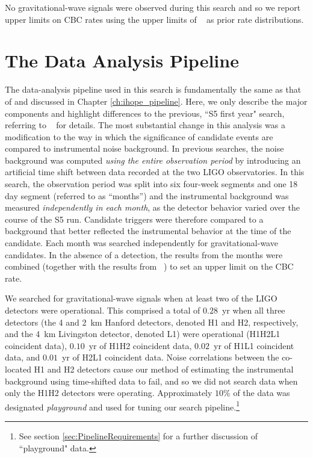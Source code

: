 No gravitational-wave signals were observed during this search and so we
report upper limits on CBC rates using the upper limits of 
~\cite{Collaboration:2009tt} as prior rate distributions.

\section{The Data Analysis Pipeline}
\label{sec:pipeline}

The data-analysis pipeline used in this search is fundamentally the same as
that of \cite{Collaboration:2009tt} and discussed in Chapter
\ref{ch:ihope_pipeline}. Here, we only describe the major components and
highlight differences to the previous, ``S5 first year" search, referring to
~\cite{LIGOS3S4all,Collaboration:2009tt} for details. The most substantial
change in this analysis was a modification to the way in which the significance
of candidate events are compared to instrumental noise background. In previous
searches, the noise background was computed \emph{using the entire observation
period} by introducing an artificial time shift between data recorded at the
two LIGO observatories. In this search, the observation period was split into
six four-week segments and one 18 day segment (referred to as ``months'') and
the instrumental background was measured \emph{independently in each month}, as
the detector behavior varied over the course of the S5 run. Candidate triggers
were therefore compared to a background that better reflected the instrumental
behavior at the time of the candidate.  Each month was searched independently
for gravitational-wave candidates. In the absence of a detection, the results
from the months were combined (together with the results from
~\cite{Collaboration:2009tt}) to set an upper limit on the CBC rate.

We searched for gravitational-wave signals when at least two of the \ac{LIGO}
detectors were operational.  This comprised a total of $0.28$~yr when all three
detectors (the 4 and 2~km Hanford detectors, denoted H1 and H2, respectively,
and the 4~km Livingston detector, denoted L1) were operational (H1H2L1
coincident data), $0.10$~yr of H1H2 coincident data, $0.02$~yr of H1L1
coincident data, and $0.01$~yr of H2L1 coincident data.  Noise correlations
between the co-located H1 and H2 detectors cause our method of estimating the
instrumental background using time-shifted data to fail, and so we did not
search data when only the H1H2 detectors were operating. Approximately $10\%$
of the data was designated \textit{playground} and used for tuning our search
pipeline.\footnote{See section \ref{sec:PipelineRequirements} for a further
discussion of ``playground" data.}

